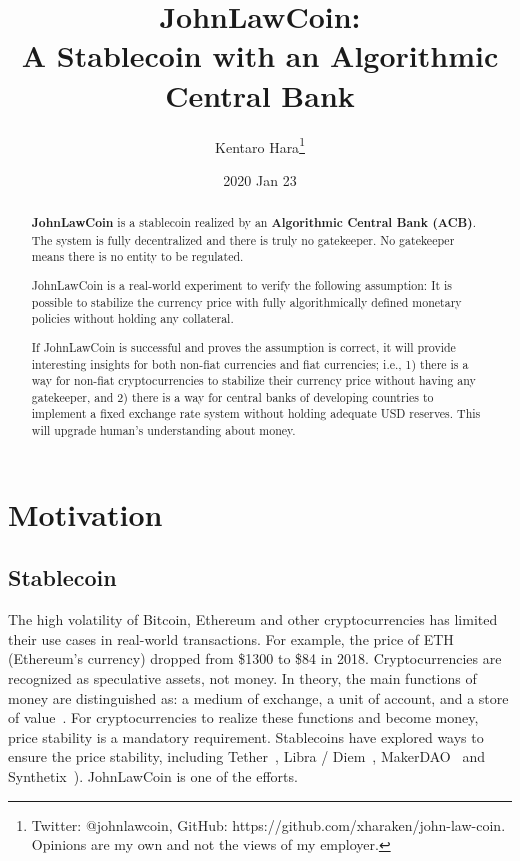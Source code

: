 \documentclass[dvipdfmx,a4paper]{article}
\title{\textbf{JohnLawCoin:\\A Stablecoin with an Algorithmic Central Bank}}
\author{Kentaro Hara\footnote{Twitter: @johnlawcoin, GitHub: https://github.com/xharaken/john-law-coin. Opinions are my own and not the views of my employer.}}
\date{2020 Jan 23}
\begin{document}
\maketitle

\begin{abstract}

\textbf{JohnLawCoin} is a stablecoin realized by an \textbf{Algorithmic Central Bank (ACB)}. The system is fully decentralized and there is truly no gatekeeper. No gatekeeper means there is no entity to be regulated.

JohnLawCoin is a real-world experiment to verify the following assumption: It is possible to stabilize the currency price with fully algorithmically defined monetary policies without holding any collateral.

If JohnLawCoin is successful and proves the assumption is correct, it will provide interesting insights for both non-fiat currencies and fiat currencies; i.e., 1) there is a way for non-fiat cryptocurrencies to stabilize their currency price without having any gatekeeper, and 2) there is a way for central banks of developing countries to implement a fixed exchange rate system without holding adequate USD reserves. This will upgrade human's understanding about money.

\end{abstract}

\section{Motivation}

\subsection{Stablecoin}

The high volatility of Bitcoin, Ethereum and other cryptocurrencies has limited their use cases in real-world transactions. For example, the price of ETH (Ethereum's currency) dropped from \$1300 to \$84 in 2018. Cryptocurrencies are recognized as speculative assets, not money. In theory, the main functions of money are distinguished as: a medium of exchange, a unit of account, and a store of value~\cite{davies2010history,ferguson2008ascent}. For cryptocurrencies to realize these functions and become money, price stability is a mandatory requirement. Stablecoins have explored ways to ensure the price stability, including Tether~\cite{tether}, Libra / Diem~\cite{libra}, MakerDAO~\cite{makerdao} and Synthetix~\cite{synthetix}). JohnLawCoin is one of the efforts.
\end{document}
